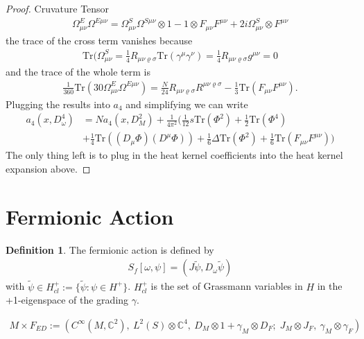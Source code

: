\documentclass[a4paper]{article}
\theoremstyle{definition}
\newtheorem{definition}{Definition}
\theoremstyle{definition}
\theoremstyle{definition}
\theoremstyle{theorem}
\theoremstyle{theorem}
\theoremstyle{theorem}
\begin{document}
\begin{proof}
     Cruvature Tensor
     \begin{align}
         \Omega_{\mu\nu}^E\Omega^{E\mu\nu} = \Omega_{\mu\nu}^S\Omega^{S\mu\nu}
         \otimes 1 - 1\otimes F_{\mu\nu}F^{\mu\nu} + 2i\Omega_{\mu\nu}^S
         \otimes F^{\mu\nu}
     \end{align}
     the trace  of the cross term vanishes because
     \begin{align}
         \text{Tr}(\Omega^{S}_{\mu\nu} = \frac{1}{4}
         R_{\mu\nu\varrho\sigma}\text{Tr}(\gamma^\mu\gamma^\nu) = \frac{1}{4}
         R_{\mu\nu\varrho\sigma}g^{\mu\nu} =0
     \end{align}
     and the trace of the whole term is
     \begin{align}
         \frac{1}{360}\text{Tr}(30\Omega^E_{\mu\nu}\Omega^{E\mu\nu}) =
         \frac{N}{24}R_{\mu\nu\varrho\sigma}R^{\mu\nu\varrho\sigma}
         -\frac{1}{3}\text{Tr}(F_{\mu\nu}F^{\mu\nu}).
     \end{align}
     Plugging the results into $a_4$ and simplifying we can write
     \begin{align}
         a_4(x, D_\omega^4) &= Na_4(x, D_M^2) + \frac{1}{4\pi^2}\bigg(\frac{1}{12} s
         \text{Tr}(\Phi^2) + \frac{1}{2}\text{Tr}(\Phi^4) \\
         &+ \frac{1}{4}
         \text{Tr}((D_\mu\Phi)(D^\mu \Phi)) + \frac{1}{6}
         \Delta\text{Tr}(\Phi^2) + \frac{1}{6}
         \text{Tr}(F_{\mu\nu}F^{\mu\nu})\bigg)
     \end{align}
     The only thing left is to plug in the heat kernel coefficients into the
     heat kernel expansion above.
\end{proof}

\section{Fermionic Action}
\begin{definition}
    The fermionic action is defined by
    \begin{align}
        S_f[\omega, \psi] = (J\tilde{\psi}, D_\omega \tilde{\psi})
    \end{align}
    with $\tilde{\psi} \in H_{cl}^+ := \{\tilde{\psi}: \psi \in H^+\}$.
    $H_{cl}^+$ is the set of Grassmann variables in $H$ in the +1-eigenspace
    of the grading $\gamma$.
\end{definition}

\begin{align}
    M\times F_{ED} := \left(C^\infty(M,\mathbb{C}^2),\ L^2(S)\otimes
    \mathbb{C}^4,\
    D_M\otimes 1 +\gamma _M \otimes D_F;\; J_M\otimes J_F,\ \gamma_M\otimes
    \gamma _F\right)
\end{align}
\end{document}
